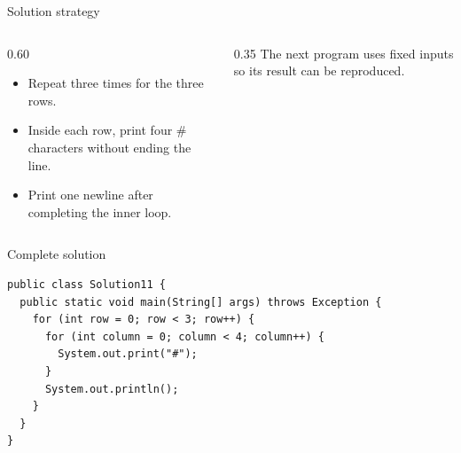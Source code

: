 \documentclass[10pt,aspectratio=169]{beamer}
\begin{document}
\begin{frame}[fragile,t]{Solution strategy}
\begin{columns}[T,onlytextwidth]\begin{column}{0.60\textwidth}
\begin{itemize}
\item Repeat three times for the three rows.
\item Inside each row, print four \# characters without ending the line.
\item Print one newline after completing the inner loop.
\end{itemize}
\end{column}\begin{column}{0.35\textwidth}\small
The next program uses fixed inputs so its result can be reproduced.
\end{column}\end{columns}
\end{frame}

\begin{frame}[fragile,t]{Complete solution}
\begin{lstlisting}
public class Solution11 {
  public static void main(String[] args) throws Exception {
    for (int row = 0; row < 3; row++) {
      for (int column = 0; column < 4; column++) {
        System.out.print("#");
      }
      System.out.println();
    }
  }
}
\end{lstlisting}
\end{frame}
\end{document}
